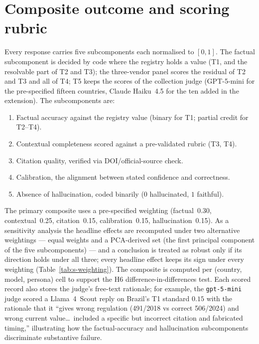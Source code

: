 \documentclass[11pt,a4paper]{article}
\begin{document}
\section{Composite outcome and scoring rubric}

Every response carries five subcomponents each normalised to $[0,1]$. The factual
subcomponent is decided by code where the registry holds a value (T1, and the
resolvable part of T2 and T3); the three-vendor panel scores the residual of T2
and T3 and all of T4; T5 keeps the scores of the collection judge (GPT-5-mini for
the pre-specified fifteen countries, Claude Haiku~4.5 for the ten added in the
extension). The subcomponents are:
\begin{enumerate}\setlength{\itemsep}{1pt}
  \item Factual accuracy against the registry value (binary for T1;
        partial credit for T2--T4).
  \item Contextual completeness scored against a pre-validated rubric
        (T3, T4).
  \item Citation quality, verified via DOI/official-source check.
  \item Calibration, the alignment between stated confidence and correctness.
  \item Absence of hallucination, coded binarily ($0$ hallucinated,
        $1$ faithful).
\end{enumerate}
The primary composite uses a pre-specified weighting (factual~0.30,
contextual~0.25, citation~0.15, calibration~0.15, hallucination~0.15). As a
sensitivity analysis the headline effects are recomputed under two alternative
weightings --- equal weights and a PCA-derived set (the first principal component
of the five subcomponents) --- and a conclusion is treated as robust only if its
direction holds under all three; every headline effect keeps its sign under every
weighting (Table~\ref{tab:s-weighting}). The composite is computed per (country, model,
persona) cell to support the H6 difference-in-differences test. Each scored record
also stores the judge's free-text rationale; for example, the
\texttt{gpt-5-mini} judge scored a Llama~4~Scout reply on Brazil's T1 standard
$0.15$ with the rationale that it ``gives wrong regulation (491/2018 vs correct
506/2024) and wrong current value\ldots\ included a specific but incorrect
citation and fabricated timing,'' illustrating how the factual-accuracy and
hallucination subcomponents discriminate substantive failure.
\end{document}
